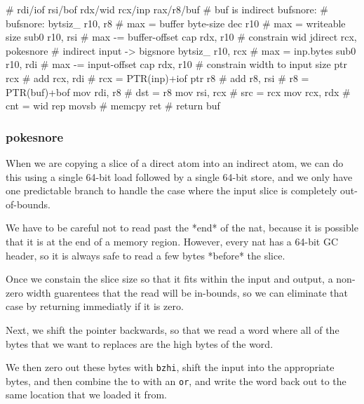 \begin{asm}
	# rdi/iof rsi/bof rdx/wid rcx/inp rax/r8/buf
	# buf is indirect
bufsnore:                                   # bufsnore:
	bytsiz_	r10, r8                     #   max  = buffer byte-size
	dec	r10                         #   max  = writeable size
	sub0	r10, rsi                    #   max -= buffer-offset
	cap	rdx, r10                    #   constrain wid
	jdirect	rcx, pokesnore              #   indirect input -> bigsnore
	bytsiz_	r10, rcx                    #   max  = inp.bytes
	sub0	r10, rdi                    #   max -= input-offset
	cap	rdx, r10                    #   constrain width to input size
	ptr	rcx                         #
	add	rcx, rdi                    #   rcx = PTR(inp)+iof
	ptr	r8                          #
	add	r8, rsi                     #   r8 = PTR(buf)+bof
	mov	rdi, r8                     #   dst = r8
	mov	rsi, rcx                    #   src = rcx
	mov	rcx, rdx                    #   cnt = wid
	rep	movsb                       #   memcpy
	ret                                 #   return buf
\end{asm}

\subsubsection{pokesnore}

When we are copying a slice of a direct atom into an indirect atom,
we can do this using a single 64-bit load followed by a single 64-bit
store, and we only have one predictable branch to handle the case where
the input slice is completely out-of-bounds.

We have to be careful not to read past the *end* of the nat, because it
is possible that it is at the end of a memory region.  However, every nat
has a 64-bit GC header, so it is always safe to read a few bytes *before*
the slice.

Once we constain the slice size so that it fits within the input and
output, a non-zero width guarentees that the read will be in-bounds,
so we can eliminate that case by returning immediatly if it is zero.

Next, we shift the pointer backwards, so that we read a word where all
of the bytes that we want to replaces are the high bytes of the word.

We then zero out these bytes with \lstinline|bzhi|, shift the input into
the appropriate bytes, and then combine the to with an \lstinline|or|,
and write the word back out to the same location that we loaded it from.

